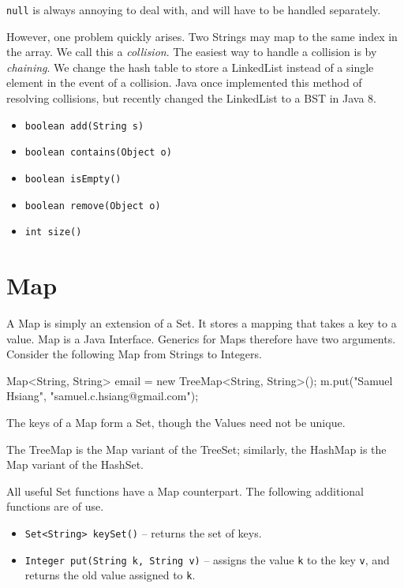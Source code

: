 \documentclass[11pt]{book}
\begin{document}
\texttt{null} is always annoying to deal with, and will have to be handled separately.

However, one problem quickly arises. Two Strings may map to the same index in the array. We call this a \textit{collision}. The easiest way to handle a collision is by \textit{chaining}. We change the hash table to store a LinkedList instead of a single element in the event of a collision. Java once implemented this method of resolving collisions, but recently changed the LinkedList to a BST in Java 8.

\begin{itemize}

\item
\texttt{boolean add(String s)}

\item
\texttt{boolean contains(Object o)}

\item
\texttt{boolean isEmpty()}

\item
\texttt{boolean remove(Object o)}

\item
\texttt{int size()}

\end{itemize}

\section{Map}

A Map is simply an extension of a Set. It stores a mapping that takes a key to a value. Map is a Java Interface. Generics for Maps therefore have two arguments. Consider the following Map from Strings to Integers.

\begin{mylstlisting}
Map<String, String> email = new TreeMap<String, String>();
m.put("Samuel Hsiang", "samuel.c.hsiang@gmail.com");
\end{mylstlisting}

The keys of a Map form a Set, though the Values need not be unique.

The TreeMap is the Map variant of the TreeSet; similarly, the HashMap is the Map variant of the HashSet.

All useful Set functions have a Map counterpart. The following additional functions are of use.

\begin{itemize}

\item
\texttt{Set<String> keySet()} -- returns the set of keys.

\item
\texttt{Integer put(String k, String v)} -- assigns the value \texttt{k} to the key \texttt{v}, and returns the old value assigned to \texttt{k}.

\end{itemize}
\end{document}
